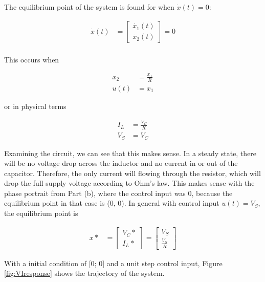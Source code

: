 \documentclass[11pt]{article}
\theoremstyle{definition}
\begin{document}
\begin{enumerate}
\begin{enumerate}
        The equilibrium point of the system is found for when $\dot{x}(t) = 0$:

        \begin{align*}
            \dot{x}(t) &= \begin{bmatrix} \dot{x_1}(t) \\ \dot{x_2}(t) \end{bmatrix} = 0 \\ 
        \end{align*}

        This occurs when

        \begin{align*}
            x_2 &= \frac{x_1}{R} \\
            u(t) &= x_1
        \end{align*}

        or in physical terms

        \begin{align*}
            I_L &= \frac{V_C}{R} \\
            V_S &= V_C
        \end{align*}

        Examining the circuit, we can see that this makes sense.  In a steady state, there will be no voltage drop across the inductor and no current in or out of the capacitor.  Therefore, the only current will flowing through the resistor, which will drop the full supply voltage according to Ohm's law.  This makes sense with the phase portrait from Part (b), where the control input was 0, because the equilibrium point in that case is (0, 0).  In general with control input $u(t) = V_S$, the equilibrium point is

        \begin{align*}
            x* &= \begin{bmatrix} V_C* \\ I_L* \end{bmatrix} = \begin{bmatrix} V_S \\ \frac{V_S} {R} \end{bmatrix}
        \end{align*}

        With a initial condition of [0; 0] and a unit step control input, Figure \ref{fig:VIresponse} shows the trajectory of the system.


\end{enumerate}
\end{enumerate}
\end{document}
